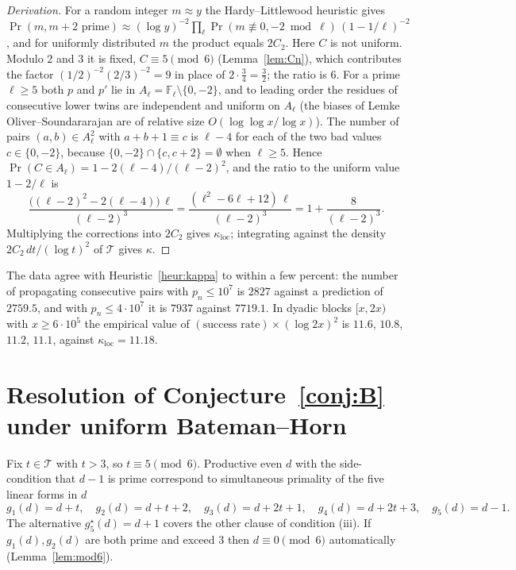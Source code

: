 \documentclass[11pt,a4paper]{article}
\theoremstyle{definition}
\theoremstyle{remark}
\newcommand{\T}{\mathcal{T}}
\newcommand{\F}{\mathbb{F}}
\begin{document}
\begin{proof}[Derivation]
For a random integer $m\approx y$ the Hardy--Littlewood heuristic \cite{HL} gives $\Pr(m,m+2\text{ prime})\approx (\log y)^{-2}\prod_\ell \Pr(m\not\equiv 0,-2 \bmod \ell)\,(1-1/\ell)^{-2}$, and for uniformly distributed $m$ the product equals $2C_2$.
Here $C$ is not uniform.
Modulo $2$ and $3$ it is fixed, $C\equiv 5\pmod 6$ (Lemma~\ref{lem:Cn}), which contributes the factor $(1/2)^{-2}(2/3)^{-2} = 9$ in place of $2\cdot\frac34 = \frac32$; the ratio is $6$.
For a prime $\ell\ge 5$ both $p$ and $p'$ lie in $A_\ell = \F_\ell\setminus\{0,-2\}$, and to leading order the residues of consecutive lower twins are independent and uniform on $A_\ell$ (the biases of Lemke Oliver--Soundararajan \cite{LOS} are of relative size $O(\log\log x/\log x)$).
The number of pairs $(a,b)\in A_\ell^2$ with $a+b+1\equiv c$ is $\ell-4$ for each of the two bad values $c\in\{0,-2\}$, because $\{0,-2\}\cap\{c,c+2\}=\emptyset$ when $\ell\ge 5$.
Hence $\Pr(C\in A_\ell) = 1-2(\ell-4)/(\ell-2)^2$, and the ratio to the uniform value $1-2/\ell$ is
\[
\frac{\bigl((\ell-2)^2-2(\ell-4)\bigr)\,\ell}{(\ell-2)^3} = \frac{(\ell^2-6\ell+12)\,\ell}{(\ell-2)^3} = 1+\frac{8}{(\ell-2)^3}.
\]
Multiplying the corrections into $2C_2$ gives $\kappa_{\mathrm{loc}}$; integrating against the density $2C_2\,dt/(\log t)^2$ of $\T$ gives $\kappa$.
\end{proof}

The data agree with Heuristic~\ref{heur:kappa} to within a few percent: the number of propagating consecutive pairs with $p_n\le 10^7$ is $2827$ against a prediction of $2759.5$, and with $p_n\le 4\cdot 10^7$ it is $7937$ against $7719.1$.
In dyadic blocks $[x,2x)$ with $x\ge 6\cdot 10^5$ the empirical value of $(\text{success rate})\times(\log 2x)^2$ is $11.6$, $10.8$, $11.2$, $11.1$, against $\kappa_{\mathrm{loc}} = 11.18$.

\section{Resolution of Conjecture~\ref{conj:B} under uniform Bateman--Horn}\label{sec:B}

Fix $t\in\T$ with $t>3$, so $t\equiv 5\pmod 6$.
Productive even $d$ with the side-condition that $d-1$ is prime correspond to simultaneous primality of the five linear forms in $d$
\begin{equation}\label{eq:five}
g_1(d) = d+t,\quad g_2(d) = d+t+2,\quad g_3(d) = d+2t+1,\quad g_4(d) = d+2t+3,\quad g_5(d) = d-1 .
\end{equation}
The alternative $g_5^\star(d) = d+1$ covers the other clause of condition (iii).
If $g_1(d), g_2(d)$ are both prime and exceed $3$ then $d\equiv 0\pmod 6$ automatically (Lemma~\ref{lem:mod6}).
\end{document}
